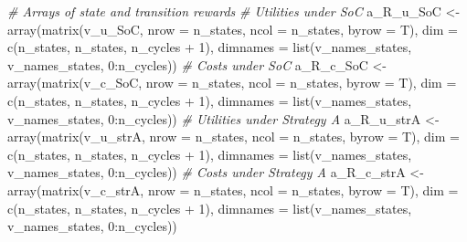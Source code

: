 \documentclass[
]{article}
\newenvironment{Shaded}{\begin{snugshade}}{\end{snugshade}}
\newcommand{\AttributeTok}[1]{\textcolor[rgb]{0.77,0.63,0.00}{#1}}
\newcommand{\CommentTok}[1]{\textcolor[rgb]{0.56,0.35,0.01}{\textit{#1}}}
\newcommand{\DecValTok}[1]{\textcolor[rgb]{0.00,0.00,0.81}{#1}}
\newcommand{\FunctionTok}[1]{\textcolor[rgb]{0.00,0.00,0.00}{#1}}
\newcommand{\NormalTok}[1]{#1}
\newcommand{\OtherTok}[1]{\textcolor[rgb]{0.56,0.35,0.01}{#1}}
\newcommand{\SpecialCharTok}[1]{\textcolor[rgb]{0.00,0.00,0.00}{#1}}
\begin{document}
\begin{Shaded}
\begin{Highlighting}[]
\CommentTok{\# Arrays of state and transition rewards}
\CommentTok{\# Utilities under SoC}
\NormalTok{a\_R\_u\_SoC }\OtherTok{\textless{}{-}} \FunctionTok{array}\NormalTok{(}\FunctionTok{matrix}\NormalTok{(v\_u\_SoC, }\AttributeTok{nrow =}\NormalTok{ n\_states, }\AttributeTok{ncol =}\NormalTok{ n\_states, }\AttributeTok{byrow =}\NormalTok{ T), }
                  \AttributeTok{dim =} \FunctionTok{c}\NormalTok{(n\_states, n\_states, n\_cycles }\SpecialCharTok{+} \DecValTok{1}\NormalTok{),}
                  \AttributeTok{dimnames =} \FunctionTok{list}\NormalTok{(v\_names\_states, v\_names\_states, }\DecValTok{0}\SpecialCharTok{:}\NormalTok{n\_cycles))}
\CommentTok{\# Costs under SoC}
\NormalTok{a\_R\_c\_SoC }\OtherTok{\textless{}{-}} \FunctionTok{array}\NormalTok{(}\FunctionTok{matrix}\NormalTok{(v\_c\_SoC, }\AttributeTok{nrow =}\NormalTok{ n\_states, }\AttributeTok{ncol =}\NormalTok{ n\_states, }\AttributeTok{byrow =}\NormalTok{ T), }
                  \AttributeTok{dim =} \FunctionTok{c}\NormalTok{(n\_states, n\_states, n\_cycles }\SpecialCharTok{+} \DecValTok{1}\NormalTok{),}
                  \AttributeTok{dimnames =} \FunctionTok{list}\NormalTok{(v\_names\_states, v\_names\_states, }\DecValTok{0}\SpecialCharTok{:}\NormalTok{n\_cycles))}
\CommentTok{\# Utilities under Strategy A}
\NormalTok{a\_R\_u\_strA }\OtherTok{\textless{}{-}}  \FunctionTok{array}\NormalTok{(}\FunctionTok{matrix}\NormalTok{(v\_u\_strA, }\AttributeTok{nrow =}\NormalTok{ n\_states, }\AttributeTok{ncol =}\NormalTok{ n\_states, }\AttributeTok{byrow =}\NormalTok{ T), }
                  \AttributeTok{dim =} \FunctionTok{c}\NormalTok{(n\_states, n\_states, n\_cycles }\SpecialCharTok{+} \DecValTok{1}\NormalTok{),}
                  \AttributeTok{dimnames =} \FunctionTok{list}\NormalTok{(v\_names\_states, v\_names\_states, }\DecValTok{0}\SpecialCharTok{:}\NormalTok{n\_cycles))}
\CommentTok{\# Costs under Strategy A}
\NormalTok{a\_R\_c\_strA }\OtherTok{\textless{}{-}} \FunctionTok{array}\NormalTok{(}\FunctionTok{matrix}\NormalTok{(v\_c\_strA, }\AttributeTok{nrow =}\NormalTok{ n\_states, }\AttributeTok{ncol =}\NormalTok{ n\_states, }\AttributeTok{byrow =}\NormalTok{ T), }
                  \AttributeTok{dim =} \FunctionTok{c}\NormalTok{(n\_states, n\_states, n\_cycles }\SpecialCharTok{+} \DecValTok{1}\NormalTok{),}
                  \AttributeTok{dimnames =} \FunctionTok{list}\NormalTok{(v\_names\_states, v\_names\_states, }\DecValTok{0}\SpecialCharTok{:}\NormalTok{n\_cycles))}

\end{Highlighting}
\end{Shaded}
\end{document}
